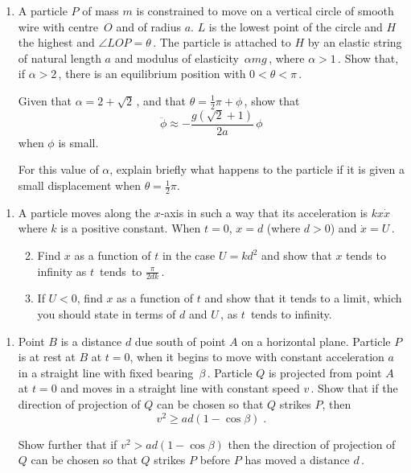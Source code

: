 \documentclass[a4, 11pt]{report}
\newlength{\qspace}
\newcounter{qnumber}
\newenvironment{question}%
 {\vspace{\qspace}
  \begin{enumerate}[\bfseries 1\quad][10]%
    \setcounter{enumi}{\value{qnumber}}%
    \item%
 }
{
  \end{enumerate}
  \filbreak
  \stepcounter{qnumber}
 }
\newenvironment{questionparts}[1][1]%
 {
  \begin{enumerate}[\bfseries (i)]%
    \setcounter{enumii}{#1}
    \addtocounter{enumii}{-1}
    \setlength{\itemsep}{5mm}
    \setlength{\parskip}{8pt}
 }
 {
  \end{enumerate}
 }
\def\ge{\geqslant}
\def\l{\left(}
\def\r{\right)}
\begin{document}
	
\begin{question}
A particle $P$ of mass $m$ is constrained to move on a vertical 
circle of smooth wire with centre~$O$ and of radius $a$. 
$L$ is the lowest point of the circle and $H$ the highest and 
$\angle LOP = \theta\,$. The particle is attached to $H$ by an 
elastic string of natural length $a$ and modulus of elasticity~$\alpha mg\,$, 
where $\alpha > 1\,$.  Show that,  if $\alpha>2\,$, there is an
equilibrium position with $0<\theta<\pi\,$.

   
Given that $\alpha =2+\sqrt 2\,$, and that 
$\displaystyle \theta = \tfrac{1}{2}\pi + \phi\,$, show that   
\[   
\ddot{\phi} \approx -\frac{g (\sqrt2+1)}{2a }\, \phi
\]   
when $\phi$ is small.   
   
For this value of $\alpha$, 
explain briefly what happens to the particle if it 
is given a small displacement when $ \theta = \frac{1}{2}\pi$.
	\end{question}
	
\begin{question}	
A particle moves along the $x$-axis in such a way that 
its acceleration is  
$kx \dot{x}\,$ where  $k$ is a positive constant.
When $t = 0$,  $x = d$ (where $d>0$) and $\dot{x} =U\,$.   
\begin{questionparts}   
\item Find $x$ as a function of $t$ in the case $U = kd^2$ 
and show that $x$ tends to infinity as $t$~tends~to 
$\displaystyle \frac{\pi }{2 dk}\,$.   
\item If $U < 0$, find $x$ as a function of $t$ 
and show that it tends to a limit, which you should state in terms of $d$ and $U\,$, 
as $t$~tends to infinity.   
\end{questionparts}   
\end{question}


\begin{question}
Point $B$ is a distance $d$ due south of point $A$ on a horizontal plane. 
Particle $P$ is at rest at $B$ at $t=0$, when it begins 
to move with constant acceleration $a$ in a straight line
with  fixed bearing~$\beta\,$. 
Particle $Q$ is projected  from 
point $A$ at $t=0$ and moves in a straight line with constant
speed $v\,$. Show that if the direction of projection of $Q$ can be chosen so that
$Q$ strikes $P$, then   
\[   
v^2 \ge ad \l 1 - \cos \beta \r\;.   
\]   

Show further that if $v^2 >ad(1-\cos\beta)$ then the direction of projection of $Q$
can be chosen so that $Q$ strikes $P$ before $P$ has moved a distance $d\,$.
\end{question}
	
\end{document}
